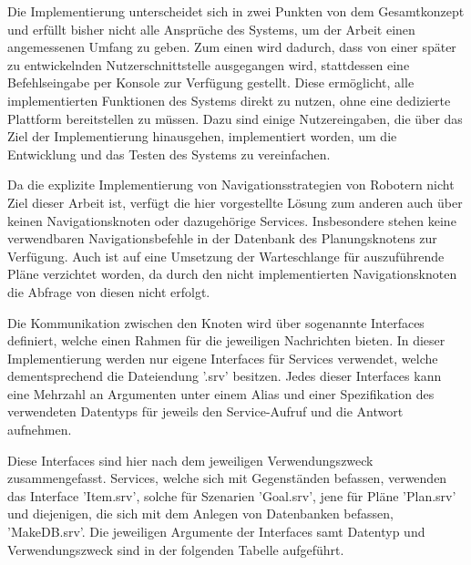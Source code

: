 Die Implementierung unterscheidet sich in zwei Punkten von dem Gesamtkonzept und erfüllt bisher nicht alle Ansprüche des Systems, um der Arbeit einen angemessenen Umfang zu geben. Zum einen wird dadurch, dass von einer später zu entwickelnden Nutzerschnittstelle ausgegangen wird, stattdessen eine Befehlseingabe per Konsole zur Verfügung gestellt. Diese ermöglicht, alle implementierten Funktionen des Systems direkt zu nutzen, ohne eine dedizierte Plattform bereitstellen zu müssen. Dazu sind einige Nutzereingaben, die über das Ziel der Implementierung hinausgehen, implementiert worden, um die Entwicklung und das Testen des Systems zu vereinfachen.

Da die explizite Implementierung von Navigationsstrategien von Robotern nicht Ziel dieser Arbeit ist, verfügt die hier vorgestellte Lösung zum anderen auch über keinen Navigationsknoten oder dazugehörige Services. Insbesondere stehen keine verwendbaren Navigationsbefehle in der Datenbank des Planungsknotens zur Verfügung. Auch ist auf eine Umsetzung der Warteschlange für auszuführende Pläne verzichtet worden, da durch den nicht implementierten Navigationsknoten die Abfrage von diesen nicht erfolgt.

Die Kommunikation zwischen den Knoten wird über sogenannte Interfaces definiert, welche einen Rahmen für die jeweiligen Nachrichten bieten. In dieser Implementierung werden nur eigene Interfaces für Services verwendet, welche dementsprechend die Dateiendung '.srv' besitzen. Jedes dieser Interfaces kann eine Mehrzahl an Argumenten unter einem Alias und einer Spezifikation des verwendeten Datentyps für jeweils den Service-Aufruf und die Antwort aufnehmen.

Diese Interfaces sind hier nach dem jeweiligen Verwendungszweck zusammengefasst. Services, welche sich mit Gegenständen befassen, verwenden das Interface 'Item.srv', solche für Szenarien 'Goal.srv', jene für Pläne 'Plan.srv' und diejenigen, die sich mit dem Anlegen von Datenbanken befassen, 'MakeDB.srv'. Die jeweiligen Argumente der Interfaces samt Datentyp und Verwendungszweck sind in der folgenden Tabelle aufgeführt.

